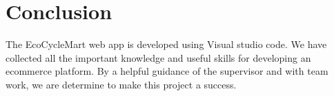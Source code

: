 \documentclass[12pt, a4paper, oneside]{article}
\begin{document}











\section{Conclusion}
The EcoCycleMart web app is developed using Visual studio code. We have collected all the important knowledge and useful skills for developing an ecommerce platform. By a helpful guidance of the supervisor and with team work, we are determine to make this project a success.
\end{document}
